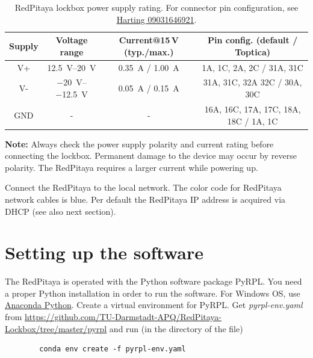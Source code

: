 \documentclass[twoside,a4paper]{refart}
\begin{document}
\begin{maxipage}
	\centering
\begin{table}[H]
	{\small
		\begin{tabular}{|c|c|c|c|}\hline
			\textbf{Supply} & \textbf{Voltage range} & \textbf{Current@15\,V (typ./max.)}	& \textbf{Pin config. (default / Toptica)}  \\\hline
			V+			& \qtyrange{12.5}{20}{\V}		& 	 \qty{0.35}{\A} / \qty{1.00}{\A}					& 1A, 1C, 2A, 2C	/  31A, 31C	 \\\hline
			V-			& \qtyrange{-20}{-12.5}{\V} 	&		\qty{0.05}{\A} / \qty{0.15}{\A}					& 31A, 31C, 32A 32C	/ 30A, 30C\\\hline
			GND			& -					&	-										& 16A, 16C, 17A, 17C, 18A, 18C  /  1A, 1C              \\\hline
		\end{tabular}
	}
	\caption{RedPitaya lockbox power supply rating. For connector pin configuration, see \href{https://b2b.harting.com/files/download/PRD/PDF_TS/0903164X921_100072506DRW176A.pdf}{Harting 09031646921}. \label{tab:power}}
\end{table}
\end{maxipage}

\textbf{Note:} Always check the power supply polarity and current rating before connecting the lockbox. Permanent damage to the device may occur by reverse polarity. The RedPitaya requires a larger current while powering up.

 Connect the RedPitaya to the local network. The color code for RedPitaya network cables is blue. Per default the RedPitaya IP address is acquired via DHCP (see also next section). 


\section{Setting up the software}

The RedPitaya is operated with the Python software package PyRPL. You need a proper Python installation in order to run the software. For Windows OS, use \href{https://www.anaconda.com/}{Anaconda Python}. Create a virtual environment for PyRPL. Get \textit{pyrpl-env.yaml} from \href{https://github.com/TU-Darmstadt-APQ/RedPitaya-Lockbox/tree/master/pyrpl}{https://github.com/TU-Darmstadt-APQ/RedPitaya-Lockbox/tree/master/pyrpl} and run (in the directory of the file)

\begin{tcolorbox}
	\begin{verbatim}
		conda env create -f pyrpl-env.yaml
	\end{verbatim}
\end{tcolorbox}
\end{document}
